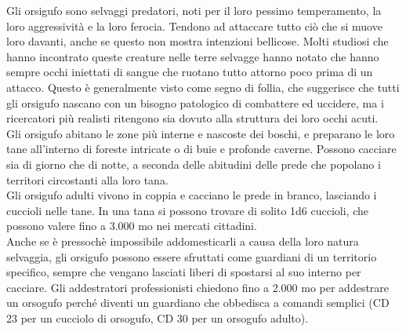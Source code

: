 \begin{multicols}{2}
Gli orsigufo sono selvaggi predatori, noti per il loro pessimo temperamento, la loro aggressività e la loro ferocia. Tendono ad attaccare tutto ciò che si muove loro davanti, anche se questo non mostra intenzioni bellicose. Molti studiosi che hanno incontrato queste creature nelle terre selvagge hanno notato che hanno sempre occhi iniettati di sangue che ruotano tutto attorno poco prima di un attacco. Questo è generalmente visto come segno di follia, che suggerisce che tutti gli orsigufo nascano con un bisogno patologico di combattere ed uccidere, ma i ricercatori più realisti ritengono sia dovuto alla struttura dei loro occhi acuti.\\
Gli orsigufo abitano le zone più interne e nascoste dei boschi, e preparano le loro tane all'interno di foreste intricate o di buie e profonde caverne. Possono cacciare sia di giorno che di notte, a seconda delle abitudini delle prede che popolano i territori circostanti alla loro tana.\\
Gli orsigufo adulti vivono in coppia e cacciano le prede in branco, lasciando i cuccioli nelle tane. In una tana si possono trovare di solito 1d6 cuccioli, che possono valere fino a 3.000 mo nei mercati cittadini.\\

Anche se è pressochè impossibile addomesticarli a causa della loro natura selvaggia, gli orsigufo possono essere sfruttati come guardiani di un territorio specifico, sempre che vengano lasciati liberi di spostarsi al suo interno per cacciare. Gli addestratori professionisti chiedono fino a 2.000 mo per addestrare un orsogufo perché diventi un guardiano che obbedisca a comandi semplici (CD 23 per un cucciolo di orsogufo, CD 30 per un orsogufo adulto).\\


\end{multicols}
